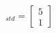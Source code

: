\documentclass[preview]{standalone}
\begin{document}
\begin{align*}
[\vec{b}]_{std}  = \begin{bmatrix} 5 \\ 1 \end{bmatrix}
\end{align*}
\end{document}
